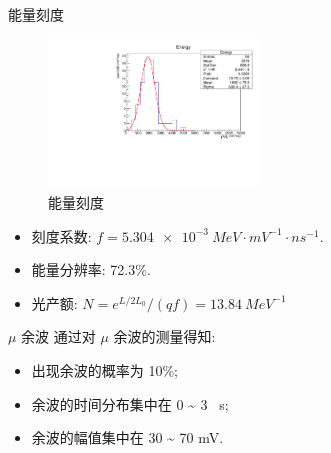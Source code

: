 \documentclass[10pt]{beamer}
\begin{document}
\begin{frame}[label={sec:org251d697}]{能量刻度}
\begin{figure}[htbp]
\centering
\includegraphics[width=0.5\textwidth]{../../DetectorPerform/ECali/qqEdist.pdf}
\caption{能量刻度}
\end{figure}
\begin{itemize}
\item 刻度系数: \(f = \qty{5.304e-3}{MeV \cdot mV^{-1} \cdot ns^{-1}}\).
\item 能量分辨率: 72.3\%.
\item 光产额: \(N = e^{L/2L_0} / (q f) = \qty{13.84}{MeV^{-1}}\)
\end{itemize}
\end{frame}

\begin{frame}[label={sec:org810d366}]{\(\mu\) 余波}
通过对 \(\mu\) 余波的测量得知:
\begin{itemize}
\item 出现余波的概率为 10\%;
\item 余波的时间分布集中在 0 \textasciitilde{} 3 \unit{\mu s};
\item 余波的幅值集中在 30 \textasciitilde{} 70 \unit{mV}.
\end{itemize}
\end{frame}
\end{document}
